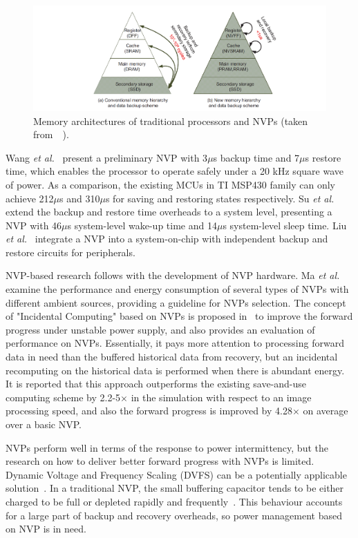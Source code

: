 \begin{figure}
    \centering
    \includegraphics[width=\columnwidth]{ch2_review/figures/nvp}
    \caption{Memory architectures of traditional processors and NVPs (taken from~\cite{liu2015ambient}~).}
    \label{Figure:nvp}
\end{figure}

Wang \textit{et al.}~\cite{wang20123us} present a preliminary NVP with 3$\mu$s backup time and 7$\mu$s restore time, which enables the processor to operate safely under a 20 kHz square wave of power. 
As a comparison, the existing MCUs in TI MSP430 family can only achieve 212$\mu$s and 310$\mu$s for saving and restoring states respectively. 
Su \textit{et al.}~\cite{su2017ferroelectric} extend the backup and restore time overheads to a system level, presenting a NVP with 46$\mu$s system-level wake-up time and 14$\mu$s system-level sleep time. 
Liu \textit{et al.}~\cite{liu2019130} integrate a NVP into a system-on-chip with independent backup and restore circuits for peripherals. 

NVP-based research follows with the development of NVP hardware. 
Ma \textit{et al.}~\cite{ma2015architecture} examine the performance and energy consumption of several types of NVPs with different ambient sources, providing a guideline for NVPs selection. 
The concept of "Incidental Computing" based on NVPs is proposed in~\cite{ma2017incidental} to improve the forward progress under unstable power supply, and also provides an evaluation of performance on NVPs. 
Essentially, it pays more attention to processing forward data in need than the buffered historical data from recovery, but an incidental recomputing on the historical data is performed when there is abundant energy. 
It is reported that this approach outperforms the existing save-and-use computing scheme by 2.2-5$\times$ in the simulation with respect to an image processing speed, and also the forward progress is improved by 4.28$\times$ on average over a basic NVP.

NVPs perform well in terms of the response to power intermittency, but the research on how to deliver better forward progress with NVPs is limited. 
Dynamic Voltage and Frequency Scaling (DVFS) can be a potentially applicable solution~\cite{ma2016nonvolatile}. 
In a traditional NVP, the small buffering capacitor tends to be either charged to be full or depleted rapidly and frequently~\cite{su2017nonvolatile}. 
This behaviour accounts for a large part of backup and recovery overheads, so power management based on NVP is in need.

